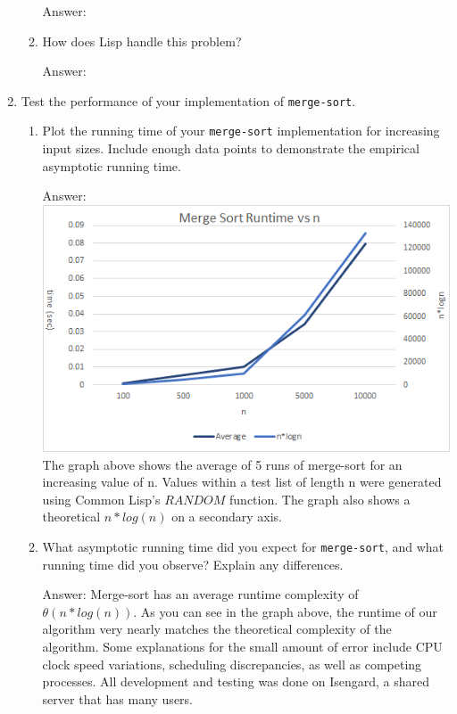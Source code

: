 \documentclass[12pt,letterpaper]{ntdhw}
\begin{document}
\begin{enumerate}
\begin{enumerate}
    \begin{emph}
      Answer: %
    \end{emph}

    \item How does Lisp handle this problem?

    \begin{emph}
      Answer: %
    \end{emph}

  \end{enumerate}


  \item Test the performance of your implementation of
    \texttt{merge-sort}.
    \begin{enumerate}
    \item Plot the running time of your \texttt{merge-sort}
      implementation for increasing input sizes.  Include enough data
      points to demonstrate the empirical asymptotic running time.

    \begin{emph}
      Answer: %
      \break \includegraphics{merge} \break
      The graph above shows the average of 5 runs of merge-sort for an increasing value of n. Values within a test list of length n were generated using Common Lisp's \(RANDOM\) function. The graph also shows a theoretical \(n*log(n)\) on a secondary axis.
      
    \end{emph}

    \item What asymptotic running time did you expect for
      \texttt{merge-sort}, and what running time did you observe?
      Explain any differences.

    \begin{emph}
      Answer: %
      Merge-sort has an average runtime complexity of \(\theta (n*log(n))\). As you can see in the graph above, the runtime of our algorithm very nearly matches the theoretical complexity of the algorithm. Some explanations for the small amount of error include CPU clock speed variations, scheduling discrepancies, as well as competing processes. All development and testing was done on Isengard, a shared server that has many users.
    \end{emph}


\end{enumerate}
\end{enumerate}
\end{document}
